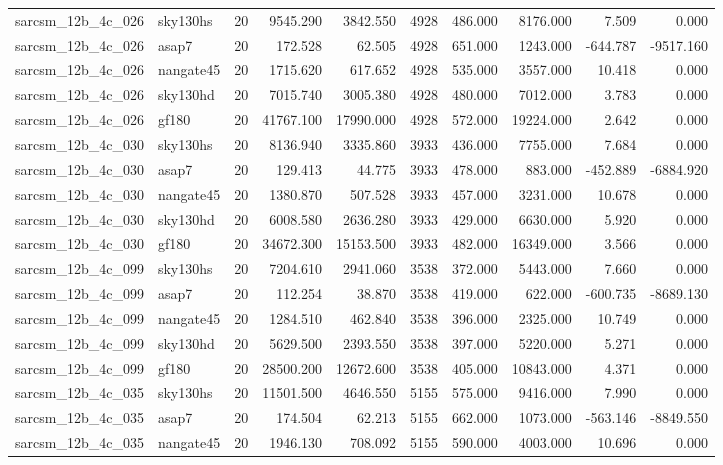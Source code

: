 \begin{tabular}{llrrrrrrrr}
sarcsm\_12b\_4c\_026 & sky130hs & 20 & 9545.290 & 3842.550 & 4928 & 486.000 & 8176.000 & 7.509 & 0.000 \\
sarcsm\_12b\_4c\_026 & asap7 & 20 & 172.528 & 62.505 & 4928 & 651.000 & 1243.000 & -644.787 & -9517.160 \\
sarcsm\_12b\_4c\_026 & nangate45 & 20 & 1715.620 & 617.652 & 4928 & 535.000 & 3557.000 & 10.418 & 0.000 \\
sarcsm\_12b\_4c\_026 & sky130hd & 20 & 7015.740 & 3005.380 & 4928 & 480.000 & 7012.000 & 3.783 & 0.000 \\
sarcsm\_12b\_4c\_026 & gf180 & 20 & 41767.100 & 17990.000 & 4928 & 572.000 & 19224.000 & 2.642 & 0.000 \\
sarcsm\_12b\_4c\_030 & sky130hs & 20 & 8136.940 & 3335.860 & 3933 & 436.000 & 7755.000 & 7.684 & 0.000 \\
sarcsm\_12b\_4c\_030 & asap7 & 20 & 129.413 & 44.775 & 3933 & 478.000 & 883.000 & -452.889 & -6884.920 \\
sarcsm\_12b\_4c\_030 & nangate45 & 20 & 1380.870 & 507.528 & 3933 & 457.000 & 3231.000 & 10.678 & 0.000 \\
sarcsm\_12b\_4c\_030 & sky130hd & 20 & 6008.580 & 2636.280 & 3933 & 429.000 & 6630.000 & 5.920 & 0.000 \\
sarcsm\_12b\_4c\_030 & gf180 & 20 & 34672.300 & 15153.500 & 3933 & 482.000 & 16349.000 & 3.566 & 0.000 \\
sarcsm\_12b\_4c\_099 & sky130hs & 20 & 7204.610 & 2941.060 & 3538 & 372.000 & 5443.000 & 7.660 & 0.000 \\
sarcsm\_12b\_4c\_099 & asap7 & 20 & 112.254 & 38.870 & 3538 & 419.000 & 622.000 & -600.735 & -8689.130 \\
sarcsm\_12b\_4c\_099 & nangate45 & 20 & 1284.510 & 462.840 & 3538 & 396.000 & 2325.000 & 10.749 & 0.000 \\
sarcsm\_12b\_4c\_099 & sky130hd & 20 & 5629.500 & 2393.550 & 3538 & 397.000 & 5220.000 & 5.271 & 0.000 \\
sarcsm\_12b\_4c\_099 & gf180 & 20 & 28500.200 & 12672.600 & 3538 & 405.000 & 10843.000 & 4.371 & 0.000 \\
sarcsm\_12b\_4c\_035 & sky130hs & 20 & 11501.500 & 4646.550 & 5155 & 575.000 & 9416.000 & 7.990 & 0.000 \\
sarcsm\_12b\_4c\_035 & asap7 & 20 & 174.504 & 62.213 & 5155 & 662.000 & 1073.000 & -563.146 & -8849.550 \\
sarcsm\_12b\_4c\_035 & nangate45 & 20 & 1946.130 & 708.092 & 5155 & 590.000 & 4003.000 & 10.696 & 0.000 \\

\end{tabular}
